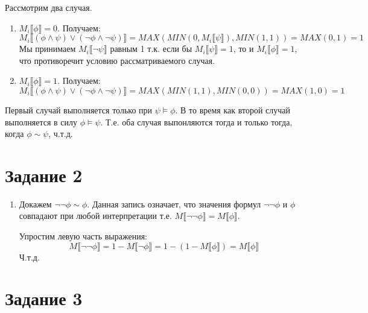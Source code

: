 \documentclass{article}
\begin{document}
\begin{enumerate}
        Рассмотрим два случая.
        \begin{enumerate}
            \item
                \(M_i\llbracket \phi \rrbracket = 0\). Получаем:
                \[
                    M_i\llbracket (\phi \land \psi) \lor (\neg \phi \land \neg \psi) \rrbracket
                    = MAX(MIN(0, M_i\llbracket\psi\rrbracket), MIN(1, 1))
                    = MAX(0, 1)
                    = 1
                \]
                Мы принимаем \(M_i\llbracket\neg\psi\rrbracket\) равным 1 т.к. если бы \(M_i\llbracket\psi\rrbracket = 1\), то и \(M_i\llbracket\phi\rrbracket = 1\), что противоречит условию рассматриваемого случая.
            \item
                \(M_i\llbracket \phi \rrbracket = 1\). Получаем:
                \[
                    M_i\llbracket (\phi \land \psi) \lor (\neg \phi \land \neg \psi) \rrbracket
                    = MAX(MIN(1, 1), MIN(0, 0))
                    = MAX(1, 0)
                    = 1
                \]
        \end{enumerate}

        Первый случай выполняется только при \(\psi \models \phi\).
        В то время как второй случай выполняется в силу \(\phi \models \psi\).
        Т.е. оба случая выпонляются тогда и только тогда, когда \(\phi \sim \psi\), ч.т.д.
\end{enumerate}

\section*{Задание 2}
\begin{enumerate}
    \item
        Докажем \(\neg \neg \phi \sim \phi\). Данная запись означает, что значения формул \(\neg \neg \phi\) и \(\phi\) совпадают при любой интерпретации т.е. \(M\llbracket \neg \neg \phi\rrbracket = M\llbracket\phi\rrbracket\).

        Упростим левую часть выражения:
        \[
            M\llbracket\neg \neg \phi \rrbracket
            = 1 - M\llbracket \neg \phi \rrbracket
            = 1 - (1 - M\llbracket\phi\rrbracket)
            = M\llbracket\phi\rrbracket
        \]
        Ч.т.д.
\end{enumerate}

\section*{Задание 3}
\end{document}

